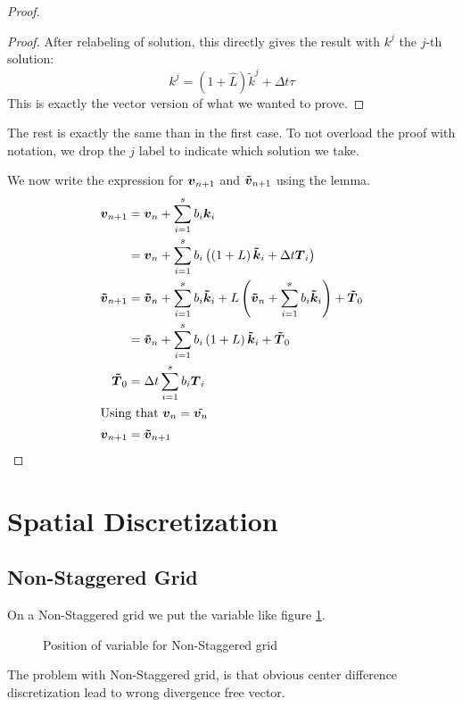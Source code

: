 \begin{proof}
\begin{proof}
After relabeling of solution, this directly gives the result with $k^{j}$ the $j$-th solution:
\begin{equation}
k^{j}=(1+\hat{L})\tilde{k}^{j}+\Delta t \tau
\end{equation}
This is exactly the vector version of what we wanted to prove.
\end{proof}

The rest is exactly the same than in the first case.
To not overload the proof with notation, we drop the $j$ label to indicate which solution we take.

We now write the expression for ${\boldsymbol {v}}_{n+1}$ and ${\boldsymbol {\tilde{v}}}_{n+1}$ using the lemma.
\begin{align*}
{\boldsymbol {v}}_{n+1}&={\boldsymbol {v}}_{n}+\sum_{i=1}^{s}b_{i}{\boldsymbol {k}}_{i}\\
&={\boldsymbol {v}}_{n}+\sum_{i=1}^{s}b_{i}\left(\left(1+L\right){\boldsymbol {\tilde{k}}}_i+\Delta t {\boldsymbol {T}}_{i}\right)\\
{\boldsymbol {\tilde{v}}}_{n+1}&={\boldsymbol {\tilde{v}}}_{n}+\sum_{i=1}^{s}b_{i}{\boldsymbol {\tilde{k}}}_{i}+L\left({\boldsymbol {\tilde{v}}}_{n}+\sum_{i=1}^{s}b_{i}{\boldsymbol {\tilde{k}}}_{i}\right)+{\boldsymbol {\tilde{T}}}_0\\
&={\boldsymbol {\tilde{v}}}_{n}+\sum_{i=1}^{s}b_{i}\left(1+L\right){\boldsymbol {\tilde{k}}}_{i}+{\boldsymbol {\tilde{T}}}_0\\
{\boldsymbol {\tilde{T}}}_0&=\Delta t\sum_{i=1}^{s}b_{i}{\boldsymbol {T}}_{i}\\
\intertext{Using that ${\boldsymbol {v}}_{n}=\tilde{{\boldsymbol {v}}_{n}}$}
{\boldsymbol {v}}_{n+1}&={\boldsymbol {\tilde{v}}}_{n+1}
\end{align*}

\end{proof}

\section{Spatial Discretization}

\subsection{Non-Staggered Grid}

On a Non-Staggered grid we put the variable like figure \ref{fixed:unstaggered}.
\begin{figure}
\caption{Position of variable for Non-Staggered grid}
\label{fixed:unstaggered}
\end{figure}
The problem with Non-Staggered  grid, is that obvious center difference discretization lead to wrong divergence free vector.

